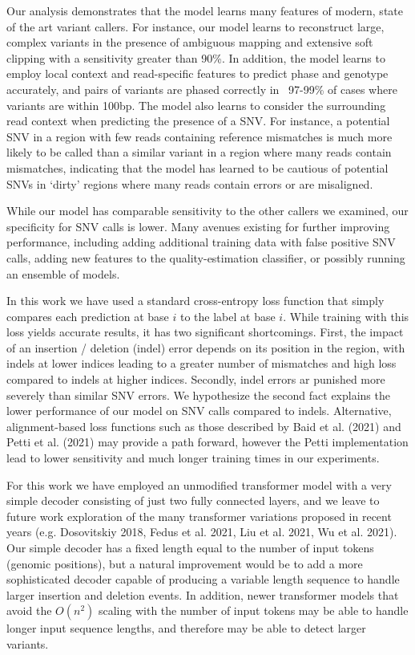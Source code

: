 \documentclass[]{article}
\begin{document}
Our analysis demonstrates that the model learns many features of modern, state of the art variant callers. For instance, our model learns to reconstruct large, complex variants in the presence of ambiguous mapping and extensive soft clipping with a sensitivity greater than 90\%. In addition, the model learns to employ local context and read-specific features to predict phase and genotype accurately, and pairs of variants are phased correctly in ~97-99\% of cases where variants are within 100bp.  The model also learns to consider the surrounding read context when predicting the presence of a SNV. For instance, a potential SNV in a region with few reads containing reference mismatches is much more likely to be called than a similar variant in a region where many reads contain mismatches, indicating that the model has learned to be cautious of potential SNVs in `dirty' regions where many reads contain errors or are misaligned. 

While our model has comparable sensitivity to the other callers we examined, our specificity for SNV calls is lower. Many avenues existing for further improving performance, including adding additional training data with false positive SNV calls, adding new features to the quality-estimation classifier, or possibly running an ensemble of models. 

In this work we have used a standard cross-entropy loss function that simply compares each prediction at base $i$ to the label at base $i$. While training with this loss yields accurate results, it has two significant shortcomings. First, the impact of an insertion / deletion (indel) error depends on its position in the region, with indels at lower indices leading to a greater number of mismatches and high loss compared to indels at higher indices. Secondly, indel errors ar punished more severely than similar SNV errors. We hypothesize the second fact explains the lower performance of our model on SNV calls compared to indels. Alternative, alignment-based loss functions such as those described by Baid et al. (2021) and Petti et al. (2021) may provide a path forward, however the Petti implementation lead to lower sensitivity and much longer training times in our experiments. 

For this work we have employed an unmodified transformer model with a very simple decoder consisting of just two fully connected layers, and we leave to future work exploration of the many transformer variations proposed in recent years (e.g. Dosovitskiy 2018, Fedus et al. 2021, Liu et al. 2021, Wu et al. 2021). Our simple decoder has a fixed length equal to the number of input tokens (genomic positions), but a natural improvement would be to add a more sophisticated decoder capable of producing a variable length sequence to handle larger insertion and deletion events.  In addition, newer transformer models that avoid the $O(n^2)$ scaling with the number of input tokens may be able to handle longer input sequence lengths, and therefore may be able to detect larger variants. 
\end{document}
